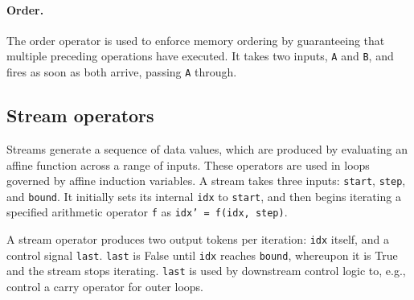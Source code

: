 \paragraph{Order.}
The order operator is used to enforce memory ordering by guaranteeing that multiple preceding operations have executed.
% 
It takes two inputs, {\tt A} and {\tt B}, and fires as soon as both arrive, passing {\tt A} through.

\subsection{Stream operators}
\label{cf:streams}
Streams generate a sequence of data values, which are 
produced by evaluating an affine function
across a range of inputs. 
%
These operators are used in loops
governed by affine induction variables.
%
A stream takes three inputs: {\tt start}, {\tt step}, and {\tt bound}.
It initially sets its internal {\tt idx} to {\tt start},
%
and then begins iterating a specified arithmetic operator {\tt f}
as \mbox{\tt idx' = f(idx, step)}.

A stream operator produces two output tokens per iteration: {\tt idx} itself,
and a control signal {\tt last}.
%
{\tt last} is False until {\tt idx} reaches {\tt bound},
whereupon it is True and the stream stops iterating.
%
{\tt last} is used by downstream control logic to, e.g., control
a carry operator for outer loops.
